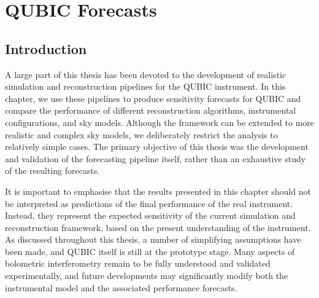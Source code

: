 \documentclass[../../thesis.tex]{subfiles}
\begin{document}
\chapter{QUBIC Forecasts} \label{chap:forecast}

\ifSubfilesClassLoaded{
    \tableofcontents
}{
    \minitoc
}

\section*{Introduction}

A large part of this thesis has been devoted to the development of realistic simulation and reconstruction pipelines for the QUBIC instrument. In this chapter, we use these pipelines to produce sensitivity forecasts for QUBIC and compare the performance of different reconstruction algorithms, instrumental configurations, and sky models. Although the framework can be extended to more realistic and complex sky models, we deliberately restrict the analysis to relatively simple cases. The primary objective of this thesis was the development and validation of the forecasting pipeline itself, rather than an exhaustive study of the resulting forecasts.

It is important to emphasise that the results presented in this chapter should not be interpreted as predictions of the final performance of the real instrument. Instead, they represent the expected sensitivity of the current simulation and reconstruction framework, based on the present understanding of the instrument. As discussed throughout this thesis, a number of simplifying assumptions have been made, and QUBIC itself is still at the prototype stage. Many aspects of bolometric interferometry remain to be fully understood and validated experimentally, and future developments may significantly modify both the instrumental model and the associated performance forecasts.


\end{document}
